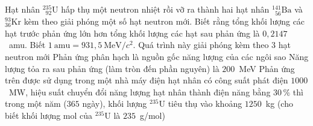 	\begin{ex}%
		Hạt nhân $^{235}_{\phantom{2}92}\text{U}$ hấp thụ một neutron nhiệt rồi vỡ ra thành hai hạt nhân ${}^{141}_{\phantom{1}56}\text{Ba}$ và ${}^{93}_{36}\text{Kr}$ kèm theo giải phóng một số hạt neutron mới. Biết rằng tổng khối lượng các hạt trước phản ứng lớn hơn tổng khối lượng các hạt sau phản ứng là $0{,}2147$~amu. Biết $1~\text{amu}=931{,}5~\text{MeV}/c^2$.
		\choiceTFt
		{Quá trình này giải phóng kèm theo $3$ hạt neutron mới}
		{Phản ứng phân hạch là nguồn gốc năng lượng của các ngôi sao}
		{\True Năng lượng tỏa ra sau phản ứng (làm tròn đến phần nguyên) là $200$~MeV}
		{Phản ứng trên được sử dụng trong một nhà máy điện hạt nhân có công suất phát điện $1000$~MW, hiệu suất chuyển đổi năng lượng hạt nhân thành điện năng bằng $30\,\%$ thì trong một năm ($365$ ngày), khối lượng $^{235}\text{U}$ tiêu thụ vào khoảng $1250$~kg (cho biết khối lượng mol của $^{235}\text{U}$ là $235$~g/mol)}
	\end{ex}

